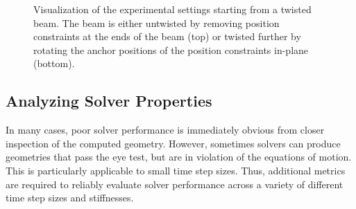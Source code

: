 \begin{figure}[h]
    \centering
    \caption{Visualization of the experimental settings starting from a twisted beam. The beam is either untwisted by removing position constraints at the 
    ends of the beam (top) or twisted further by rotating the anchor positions of the position constraints in-plane (bottom).}
    \label{fig:twisting-beam-setup}
\end{figure}

\subsection{Analyzing Solver Properties}\label{ss:analysis-solvers}
In many cases, poor solver performance is immediately obvious from closer inspection of the computed geometry. However, sometimes solvers can produce geometries 
that pass the eye test, but are in violation of the equations of motion. This is particularly applicable to small time step sizes. Thus, additional metrics are 
required to reliably evaluate solver performance across a variety of different time step sizes and stiffnesses. 

